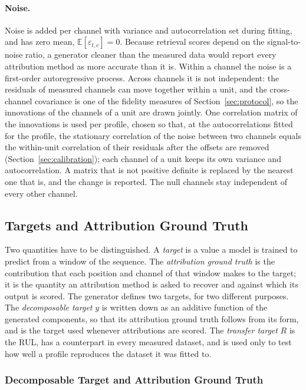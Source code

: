 \documentclass{article}
\newif\ifreview \reviewtrue        %
\newcommand{\rev}[1]{\ifreview\textcolor[HTML]{0B5FA5}{#1}\else#1\fi}
\newcommand{\revwhy}[1]{\ifreview\marginpar{\footnotesize\raggedright\textcolor[HTML]{0B5FA5}{#1}}\fi}
\begin{document}
\paragraph{Noise.}
Noise is added per channel with variance and autocorrelation set during fitting, and has zero mean, $\mathbb{E}[\varepsilon_{t,c}] = 0$. Because retrieval scores depend on the signal-to-noise ratio, a generator cleaner than the measured data would report every attribution method as more accurate than it is. \rev{Within a channel the noise is a first-order autoregressive process. Across channels it is not independent: the residuals of measured channels can move together within a unit, and the cross-channel covariance is one of the fidelity measures of Section~\ref{sec:protocol}, so the innovations of the channels of a unit are drawn jointly. One correlation matrix of the innovations is used per profile, chosen so that, at the autocorrelations fitted for the profile, the stationary correlation of the noise between two channels equals the within-unit correlation of their residuals after the offsets are removed (Section~\ref{sec:calibration}); each channel of a unit keeps its own variance and autocorrelation. A matrix that is not positive definite is replaced by the nearest one that is, and the change is reported. The null channels stay independent of every other channel.}\revwhy{X3: noise correlated across channels}
 
\subsection{Targets and Attribution Ground Truth}
\label{sec:target}
 
Two quantities have to be distinguished. A \emph{target} is a value a model is trained to predict from a window of the sequence. The \emph{attribution ground truth} is the contribution that each position and channel of that window makes to the target; it is the quantity an attribution method is asked to recover and against which its output is scored. The generator defines two targets, for two different purposes. The \emph{decomposable target} $y$ is written down as an additive function of the generated components, so that its attribution ground truth follows from its form, and is the target used whenever attributions are scored. The \emph{transfer target} $R$ is the RUL, has a counterpart in every measured dataset, and is used only to test how well a profile reproduces the dataset it was fitted to.
 
\subsubsection{Decomposable Target and Attribution Ground Truth}
 
\end{document}
